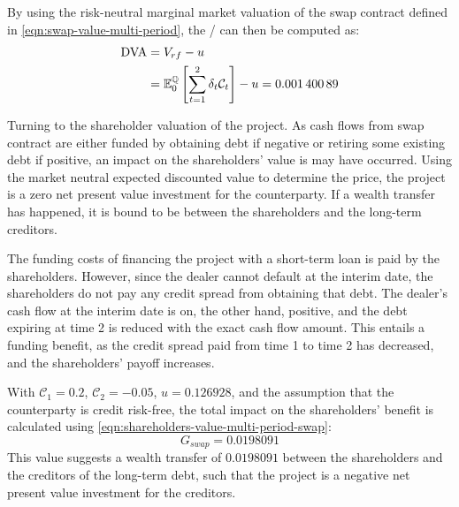 \documentclass[main.tex]{subfiles}
\begin{document}
            By using the risk-neutral marginal market valuation of the swap contract
            defined in \cref{eqn:swap-value-multi-period},
            the \DVA/ can then be computed as:
            \begin{align}
                \DVA/ &= V_{rf} - u
                \nonumber
                \\
                &= \mathbb{E}_{0}^{\rnmeasure}\left[\sum_{t=1}^{2}\delta_t \mathcal{C}_t\right] - u
                = \num{0.00140089}
            \end{align}

            Turning to the shareholder valuation of the project.
            As cash flows from swap contract are either funded by obtaining debt if negative or retiring some existing debt if positive,
            an impact on the shareholders' value is may have occurred.
            Using the market neutral expected discounted value to determine the price, the project is a zero net present value investment for the counterparty.
            If a wealth transfer has happened, it is bound to be between the shareholders and the long-term creditors.

            The funding costs of financing the project with a short-term loan is paid by the shareholders.
            However, since the dealer cannot default at the interim date,
            the shareholders do not pay any credit spread from obtaining that debt.
            The dealer's cash flow at the interim date is on, the other hand, positive,
            and the debt expiring at time 2 is reduced with the exact cash flow amount.
            This entails a funding benefit, as the credit spread paid from time 1 to time 2 has decreased,
            and the shareholders' payoff increases.
            
            With $\mathcal{C}_1=\num{0.2}$,
            $\mathcal{C}_2=\num{-0.05}$,
            $u=\num{0.126928}$,
            and the assumption that the counterparty is credit risk-free,
            the total impact on the shareholders' benefit is calculated using \cref{eqn:shareholders-value-multi-period-swap}:
            \begin{equation}
                G_{swap} = \num{0.0198091}
            \end{equation}
            This value suggests a wealth transfer of $\num{0.0198091}$
            between the shareholders and the creditors of the long-term debt,
            such that the project is a negative net present value investment for the creditors.
\end{document}

